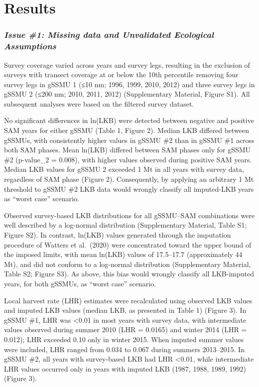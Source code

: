 \documentclass[]{elsarticle} %
\begin{document}
\section{Results}\label{results}

\subsubsection{\texorpdfstring{\emph{Issue \#1: Missing data and
Unvalidated Ecological
Assumptions}}{Issue \#1: Missing data and Unvalidated Ecological Assumptions}}\label{issue-1-missing-data-and-unvalidated-ecological-assumptions-1}

Survey coverage varied across years and survey legs, resulting in the
exclusion of surveys with transect coverage at or below the 10th
percentile removing four survey legs in gSSMU 1 (≤10 nm; 1996, 1999,
2010, 2012) and three survey legs in gSSMU 2 (≤200 nm; 2010, 2011, 2012)
(Supplementary Material, Figure S1). All subsequent analyses were based
on the filtered survey dataset.

No significant differences in ln(LKB) were detected between negative and
positive SAM years for either gSSMU (Table 1, Figure 2). Median LKB
differed between gSSMUs, with consistently higher values in gSSMU \#2
than in gSSMU \#1 across both SAM phases. Mean ln(LKB) differed between
SAM phases only for gSSMU \#2 (p-value\_2 = 0.008), with higher values
observed during positive SAM years. Median LKB values for gSSMU 2
exceeded 1 Mt in all years with survey data, regardless of SAM phase
(Figure 2). Consequently, by applying an arbitrary 1 Mt threshold to
gSSMU \#2 LKB data would wrongly classify all imputed-LKB years as
``worst case'' scenario.

Observed survey-based LKB distributions for all gSSMU--SAM combinations
were well described by a log-normal distribution (Supplementary
Material, Table S1; Figure S2). In contrast, ln(LKB) values generated
through the imputation procedure of Watters et al.~(2020) were
concentrated toward the upper bound of the imposed limits, with mean
ln(LKB) values of 17.5--17.7 (approximately 44 Mt), and did not conform
to a log-normal distribution (Supplementary Material, Table S2; Figure
S3). As above, this bias would wrongly classify all LKB-imputed years,
for both gSSMUs, as ``worst case'' scenario.

Local harvest rate (LHR) estimates were recalculated using observed LKB
values and imputed LKB values (median LKB, as presented in Table 1)
(Figure 3). In gSSMU \#1, LHR was \textless0.01 in most years with
survey data, with intermediate values observed during summer 2010 (LHR =
0.0165) and winter 2014 (LHR = 0.012); LHR exceeded 0.10 only in winter
2015. When imputed summer values were included, LHR ranged from 0.034 to
0.067 during summers 2013--2015. In gSSMU \#2, all years with
survey-based LKB had LHR \textless0.01, while intermediate LHR values
occurred only in years with imputed LKB (1987, 1988, 1989, 1992) (Figure
3).
\end{document}
